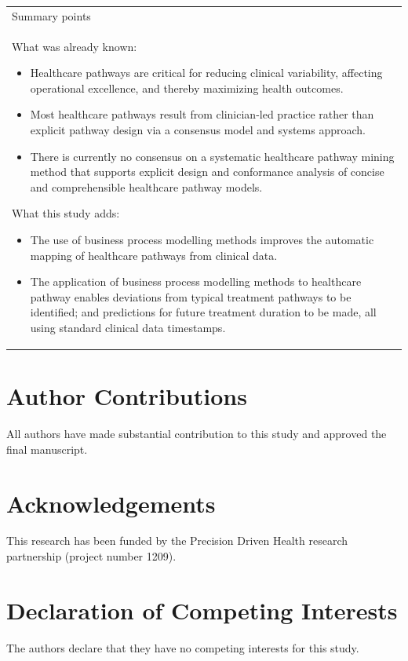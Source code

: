 \documentclass{elsarticle}
\begin{document}
\begin{table}[h]
\centering
\begin{tabular}{p{11cm}} 
 Summary points\\ 
 What was already known:
 \begin{itemize}
     \item Healthcare pathways are critical for reducing clinical variability, affecting operational excellence, and thereby maximizing health outcomes.
     \item  Most healthcare pathways result from clinician-led practice rather than explicit pathway design via a consensus model and systems approach. 
     \item  There is currently no consensus on a systematic healthcare pathway mining method that supports explicit design and conformance analysis of concise and comprehensible healthcare pathway models.
 \end{itemize}
 What this study adds:
 \begin{itemize}
     \item  The use of business process modelling methods improves the automatic mapping of healthcare pathways from clinical data.
     \item The application of business process modelling methods to healthcare pathway enables deviations from typical treatment pathways to be identified; and predictions for future treatment duration to be made, all using standard clinical data timestamps. 
 \end{itemize}
\end{tabular}
\end{table}

\section*{Author Contributions}
All authors have made substantial contribution to this study and approved the final manuscript.

\section*{Acknowledgements}
This research has been funded by the Precision Driven Health research partnership (project number 1209).

\section*{Declaration of Competing Interests}
The authors declare that they have no competing interests for this study.


\end{document}

